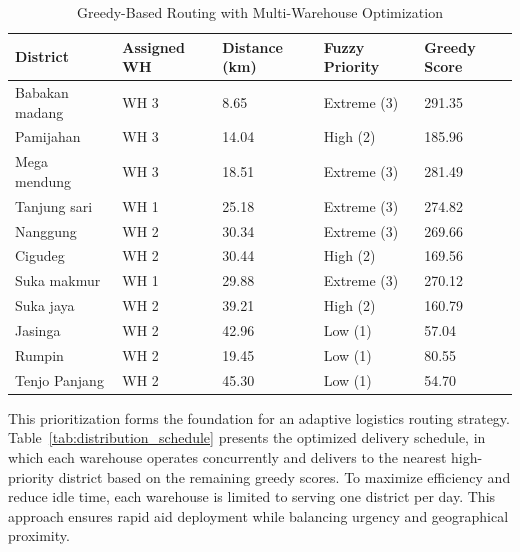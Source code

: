 \documentclass[conference,final,a4paper,twoside,10pt]{IEEEtran}
\begin{document}
\begin{table}[H]
\caption{Greedy-Based Routing with Multi-Warehouse Optimization}
\begin{center}
\begin{tabular}{|p{1.5cm}|p{1cm}|p{1cm}|p{1cm}|p{1cm}|}
\hline
\textbf{District} & \textbf{Assigned WH} & \textbf{Distance (km)} & \textbf{Fuzzy Priority} & \textbf{Greedy Score} \\
\hline
Babakan madang & WH 3 & 8.65 & Extreme (3) & 291.35 \\
\hline Pamijahan & WH 3 & 14.04 & High (2) & 185.96 \\
\hline Mega mendung & WH 3 & 18.51 & Extreme (3) & 281.49 \\
\hline  Tanjung sari & WH 1 & 25.18 & Extreme (3) & 274.82 \\
\hline Nanggung & WH 2 & 30.34 & Extreme (3) & 269.66 \\
\hline Cigudeg & WH 2 & 30.44 & High (2) & 169.56 \\
\hline Suka makmur & WH 1 & 29.88 & Extreme (3) & 270.12 \\
\hline Suka jaya & WH 2 & 39.21 & High (2) & 160.79 \\
\hline Jasinga & WH 2 & 42.96 & Low (1) & 57.04 \\
\hline Rumpin & WH 2 & 19.45 & Low (1) & 80.55 \\
\hline Tenjo Panjang & WH 2 & 45.30 & Low (1) & 54.70 \\
\hline
\end{tabular}
\label{tab:greedy_multiwh}
\end{center}
\end{table}

This prioritization forms the foundation for an adaptive logistics routing strategy. Table~\ref{tab:distribution_schedule} presents the optimized delivery schedule, in which each warehouse operates concurrently and delivers to the nearest high-priority district based on the remaining greedy scores. To maximize efficiency and reduce idle time, each warehouse is limited to serving one district per day. This approach ensures rapid aid deployment while balancing urgency and geographical proximity.
\end{document}
